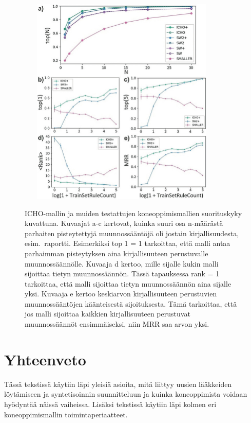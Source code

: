 \documentclass[finnish,twoside,censored,tkt,sw-line]{HYthesisML}
\begin{document}
\begin{figure}[!ht]
    \centering
    \includegraphics[width=10cm, height=10cm]{icho-performance-fig.jpg}
    \caption{
        ICHO-mallin ja muiden testattujen koneoppimismallien suorituskyky kuvattuna.
        Kuvaajat a-c kertovat, kuinka suuri osa n-määrästä parhaiten pisteytettyjä muunnossääntöjä oli jostain kirjallisuudesta, esim.\ raportti.
        Esimerkiksi top 1 = 1 tarkoittaa, että malli antaa parhaimman pisteytyksen aina kirjallisuuteen perustuvalle muunnossäännölle.
        Kuvaaja d kertoo, mille sijalle kukin malli sijoittaa tietyn muunnossäännön.
        Tässä tapauksessa rank = 1 tarkoittaa, että malli sijoittaa tietyn muunnossäännön aina sijalle yksi.
        Kuvaaja e kertoo keskiarvon kirjallisuuteen perustuvien muunnossääntöjen käänteisestä sijoituksesta.
        Tämä tarkoittaa, että jos malli sijoittaa kaikkien kirjallisuuteen perustuvat muunnossäännöt ensimmäiseksi, niin MRR saa arvon yksi.
    }
    {\cite{ExpertKnowledgeRetorsynthesis}}
    {\label{fig:icho-performance}}
\end{figure}

\chapter{Yhteenveto}

Tässä tekstissä käytiin läpi yleisiä asioita, mitä liittyy uusien lääkkeiden löytämiseen ja syntetisoinnin suunnitteluun ja kuinka koneoppimista voidaan hyödyntää näissä vaiheissa.
Lisäksi tekstissä käytiin läpi kolmen eri koneoppimismallin toimintaperiaatteet.
\end{document}
